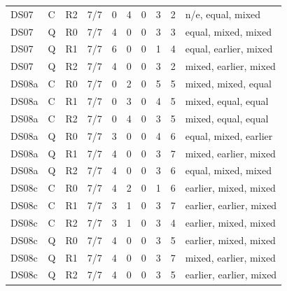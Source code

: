 \documentclass[10pt]{article}
\begin{document}
{\begin{longtable}{lllrrrrrrl}
DS07 & C & R2 & 7/7 & 0 & 4 & 0 & 3 & 2 & n/e, equal, mixed \\
DS07 & Q & R0 & 7/7 & 4 & 0 & 0 & 3 & 3 & equal, mixed, mixed \\
DS07 & Q & R1 & 7/7 & 6 & 0 & 0 & 1 & 4 & equal, earlier, mixed \\
DS07 & Q & R2 & 7/7 & 4 & 0 & 0 & 3 & 2 & mixed, earlier, mixed \\
\midrule
DS08a & C & R0 & 7/7 & 0 & 2 & 0 & 5 & 5 & mixed, mixed, equal \\
DS08a & C & R1 & 7/7 & 0 & 3 & 0 & 4 & 5 & mixed, equal, equal \\
DS08a & C & R2 & 7/7 & 0 & 4 & 0 & 3 & 5 & mixed, equal, equal \\
DS08a & Q & R0 & 7/7 & 3 & 0 & 0 & 4 & 6 & equal, mixed, earlier \\
DS08a & Q & R1 & 7/7 & 4 & 0 & 0 & 3 & 7 & mixed, earlier, mixed \\
DS08a & Q & R2 & 7/7 & 4 & 0 & 0 & 3 & 6 & equal, mixed, mixed \\
\midrule
DS08c & C & R0 & 7/7 & 4 & 2 & 0 & 1 & 6 & earlier, mixed, mixed \\
DS08c & C & R1 & 7/7 & 3 & 1 & 0 & 3 & 7 & earlier, earlier, mixed \\
DS08c & C & R2 & 7/7 & 3 & 1 & 0 & 3 & 4 & earlier, mixed, mixed \\
DS08c & Q & R0 & 7/7 & 4 & 0 & 0 & 3 & 5 & earlier, mixed, mixed \\
DS08c & Q & R1 & 7/7 & 4 & 0 & 0 & 3 & 7 & mixed, earlier, mixed \\
DS08c & Q & R2 & 7/7 & 4 & 0 & 0 & 3 & 5 & earlier, earlier, mixed \\
\end{longtable}
\vspace{-0.6em}
}
\end{document}

